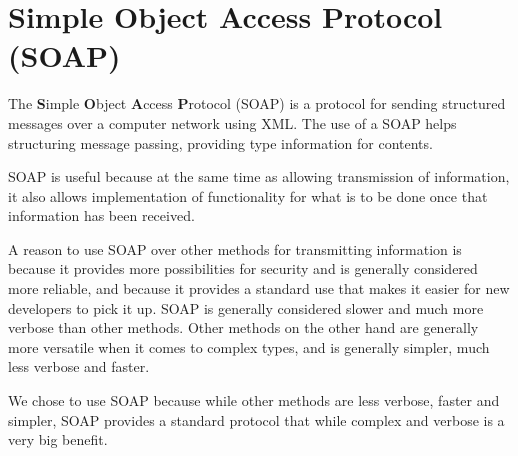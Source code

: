 \section{Simple Object Access Protocol (SOAP)}
The \textbf{S}imple \textbf{O}bject \textbf{A}ccess \textbf{P}rotocol (SOAP) is a protocol for sending structured messages over a computer network using XML. 
The use of a SOAP helps structuring message passing, providing type information for contents. 

SOAP is useful because at the same time as allowing transmission of information, it also allows implementation of functionality for what is to be done once that information has been received.

A reason to use SOAP over other methods for transmitting information is because it provides more possibilities for security and is generally considered more reliable, and because it provides a standard use that makes it easier for new developers to pick it up. 
SOAP is generally considered slower and much more verbose than other methods.
Other methods on the other hand are generally more versatile when it comes to complex types, and is generally simpler, much less verbose and faster.

We chose to use SOAP because while other methods are less verbose, faster and simpler, SOAP provides a standard protocol that while complex and verbose is a very big benefit.